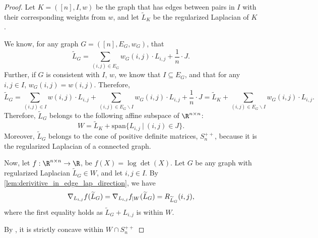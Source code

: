 \begin{proof}
    Let $K=([n], I, w)$ be the graph that has edges between pairs in $I$ with their corresponding weights from $w$, and let $\widetilde{L}_K$ be the regularized Laplacian of $K$.
    
    We know, for any graph $G=([n], E_G, w_G)$, that
    \[
    \widetilde{L}_G = \sum_{(i,j)\in E_G}{w_G(i,j)\cdot L_{i,j}} + \frac{1}{n}\cdot J. 
    \]
    Further, if $G$ is consistent with $I$, $w$, we know that $I\subseteq E_G$, and that for any $i,j\in I$, $w_G(i,j) = w(i,j)$.  Therefore,
    \[
    \widetilde{L}_G = \sum_{(i,j)\in I}{w(i,j)\cdot L_{i,j}} + \sum_{(i,j)\in E_G\backslash I}{w_G(i,j)\cdot L_{i,j}} + \frac{1}{n}\cdot J = \widetilde{L}_K + \sum_{(i,j)\in E_G\backslash I}{w_G(i,j)\cdot L_{i,j}}. 
    \]
    Therefore, $\widetilde{L}_G$ belongs to the following affine subspace of $\R^{n\times n}$:
    \[
        W = \widetilde{L}_K + \text{span} \{ L_{i,j} \ | \ (i,j) \in J \}.
    \]
    Moreover, $\widetilde{L}_G$ belongs to the cone of positive definite matrices, $S_n^{++}$, because it is the regularized Laplacian of a connected graph.
    

    
    

    Now, let $f:\R^{n\times n}\to\R$, be $f(X) = \log\det(X)$. Let $G$ be any graph with regularized Laplacian $\widetilde{L}_G\in W$, and let $i,j\in I$.
    By \cref{lem:derivitive_in_edge_lap_direction}, we have
    \[
        \nabla_{L_{i,j}} f(\widetilde{L}_G) = \nabla_{L_{i,j}} f_{|W}(\widetilde{L}_G) = R_{\widetilde{L}_G}{(i,j)},
    \]
    where the first equality holds as $\widetilde{L}_G + L_{i,j}$ is within $W$.

    By , it is strictly concave %
    within $W \cap S_n^{++}$ 


\end{proof}
